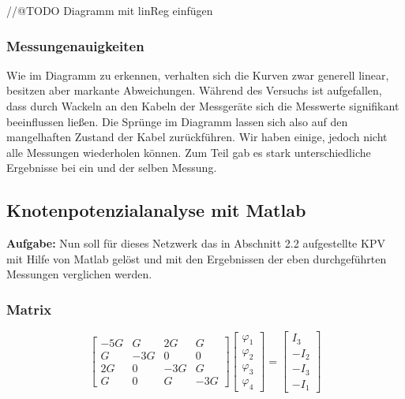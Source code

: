 \documentclass[10pt]{report}
\begin{document}
		//@TODO Diagramm mit linReg einfügen
		
        \subsubsection{Messungenauigkeiten}
        Wie im Diagramm zu erkennen, verhalten sich die Kurven zwar generell linear,
        besitzen aber markante Abweichungen. Während des Versuchs ist aufgefallen,
        dass durch Wackeln an den Kabeln der Messgeräte sich die Messwerte
        signifikant beeinflussen ließen. Die Sprünge im Diagramm lassen sich
        also auf den mangelhaften Zustand der Kabel zurückführen. Wir haben einige,
        jedoch nicht alle Messungen wiederholen können. Zum Teil gab es stark
        unterschiedliche Ergebnisse bei ein und der selben Messung.


        \subsection{Knotenpotenzialanalyse mit Matlab}
        \textbf{Aufgabe:} Nun soll für dieses Netzwerk das in Abschnitt 2.2 aufgestellte KPV mit Hilfe von Matlab
        gelöst und mit den Ergebnissen der eben durchgeführten Messungen verglichen werden.

        \vspace{0.5cm}

        \subsubsection{Matrix}
        \begin{equation*}
            \begin{bmatrix}
                -5G & G & 2G & G\\
                G & -3G & 0 & 0\\
                2G & 0 & -3G & G\\
                G & 0 & G & -3G
            \end{bmatrix}
            \begin{bmatrix}
                \varphi_1 \\
                \varphi_2 \\
                \varphi_3 \\
                \varphi_4
            \end{bmatrix}
            =
            \begin{bmatrix}
                I_3\\
                -I_2\\
                -I_3\\
                -I_1
            \end{bmatrix}
        \end{equation*}
\end{document}
